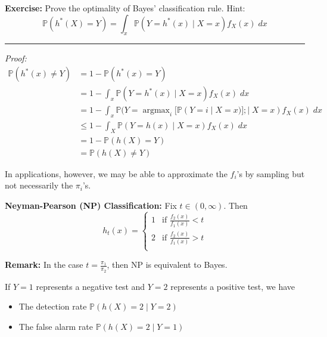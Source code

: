 \documentclass[12pt]{report}
\renewcommand{\P}{\mathbb{P}}
\renewcommand{\div}{\vspace*{10pt}\hrule\vspace*{10pt}}
\newcommand*{\tbf}[1]{\ifmmode\mathbf{#1}\else\textbf{#1}\fi}
\DeclareMathOperator*{\argmax}{\arg\max}
\newenvironment*{exercise}[1][red]{
    \begin{tcolorbox}[
        parbox=false,
        colback=#1!5!white,
        colframe=#1!75!black,
        breakable
    ]}
    {\end{tcolorbox}}
\newenvironment*{proposition}[1][gray]{
\begin{tcolorbox}[
    parbox=false,
    colback=#1!5!white,
    colframe=#1!75!black,
    breakable
]}
{\end{tcolorbox}}
\begin{document}
\begin{exercise}
    \textbf{Exercise:} Prove the optimality of Bayes' classification rule. Hint:
    \[\P(h^*(X) = Y) = \int_x \P(Y = h^*(x) \; | \; X = x) f_X(x)\; dx\]

    \div

    \emph{Proof:}
    \begin{align*}
        \P(h^*(x) \neq Y) & = 1 - \P(h^*(x) = Y)                                                             \\
                          & = 1 - \int_x \P(Y = h^*(x) \; | \; X = x) f_X(x)\; dx                            \\
                          & = 1 - \int_x \P(Y = \argmax_i [\P(Y = i \; | \; X = x)]; | \; X = x) f_X(x)\; dx \\
                          & \leq 1 - \int_X \P(Y = h(x) \; | \;X = x) f_X(x)\; dx                            \\
                          & = 1 - \P(h(X) = Y)                                                               \\
                          & = \P(h(X) \neq Y)
    \end{align*}
\end{exercise}


In applications, however, we may be able to approximate the $f_i$'s by sampling but not necessarily the $\pi_i$'s.

\begin{proposition}
    \textbf{Neyman-Pearson (NP) Classification:} Fix $t \in (0, \infty)$. Then
    \[h_t(x) = \begin{cases}
            1 & \text{if } \frac{f_2(x)}{f_1(x)} < t \\
            2 & \text{if } \frac{f_2(x)}{f_1(x)} > t \\
        \end{cases}\]
\end{proposition}

\tbf{Remark:} In the case $t = \frac{\pi_1}{\pi_2}$, then NP is equivalent to Bayes.

If $Y = 1$ represents a negative test and $Y = 2$ represents a positive test, we have
\begin{itemize}
    \item The detection rate $\P(h(X) = 2 \; | \; Y = 2)$
    \item The false alarm rate $\P(h(X) = 2 \; | \; Y = 1)$
\end{itemize}
\end{document}
